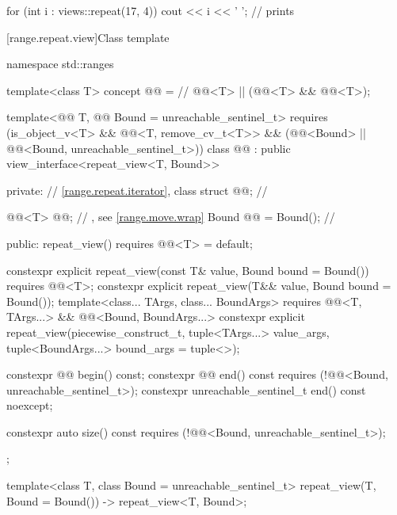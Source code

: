 \pnum
\begin{example}
\begin{codeblock}
for (int i : views::repeat(17, 4))
  cout << i << ' ';
// prints 
\end{codeblock}
\end{example}

[range.repeat.view]{Class template }

\begin{codeblock}
namespace std::ranges {
  template<class T>
    concept @@ =  // \expos
      @@<T> || (@@<T> && @@<T>);

  template<@@ T, @@ Bound = unreachable_sentinel_t>
    requires (is_object_v<T> && @@<T, remove_cv_t<T>> &&
              (@@<Bound> ||
               @@<Bound, unreachable_sentinel_t>))
  class @@ : public view_interface<repeat_view<T, Bound>> {
  private:
    // \ref{range.repeat.iterator}, class 
    struct @@;                            // \expos

    @@<T> @@;                      // \expos, see \ref{range.move.wrap}
    Bound @@ = Bound();                     // \expos

  public:
    repeat_view() requires @@<T> = default;

    constexpr explicit repeat_view(const T& value, Bound bound = Bound())
      requires @@<T>;
    constexpr explicit repeat_view(T&& value, Bound bound = Bound());
    template<class... TArgs, class... BoundArgs>
      requires @@<T, TArgs...> &&
               @@<Bound, BoundArgs...>
    constexpr explicit repeat_view(piecewise_construct_t,
      tuple<TArgs...> value_args, tuple<BoundArgs...> bound_args = tuple<>{});

    constexpr @@ begin() const;
    constexpr @@ end() const requires (!@@<Bound, unreachable_sentinel_t>);
    constexpr unreachable_sentinel_t end() const noexcept;

    constexpr auto size() const requires (!@@<Bound, unreachable_sentinel_t>);
  };

  template<class T, class Bound = unreachable_sentinel_t>
    repeat_view(T, Bound = Bound()) -> repeat_view<T, Bound>;
}
\end{codeblock}

